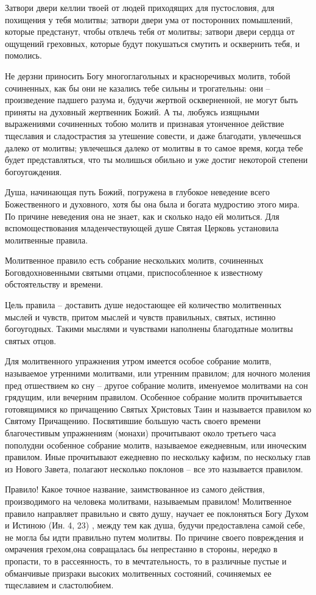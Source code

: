 Затвори двери келлии твоей от людей приходящих для пустословия, для похищения у тебя молитвы; затвори двери ума от посторонних помышлений, которые предстанут, чтобы отвлечь тебя от молитвы; затвори двери сердца от ощущений греховных, которые будут покушаться смутить и осквернить тебя, и помолись.

Не дерзни приносить Богу многоглагольных и красноречивых молитв, тобой сочиненных, как бы они не казались тебе сильны и трогательны: они – произведение падшего разума и, будучи жертвой оскверненной, не могут быть приняты на духовный жертвенник Божий. А ты, любуясь изящными выражениями сочиненных тобою молитв и признавая утонченное действие тщеславия и сладострастия за утешение совести, и даже благодати, увлечешься далеко от молитвы; увлечешься далеко от молитвы в то самое время, когда тебе будет представляться, что ты молишься обильно и уже достиг некоторой степени богоугождения.

Душа, начинающая путь Божий, погружена в глубокое неведение всего Божественного и духовного, хотя бы она была и богата мудростию этого мира. По причине неведения она не знает, как и сколько надо ей молиться. Для вспомоществования младенчествующей душе Святая Церковь установила молитвенные правила.

Молитвенное правило есть собрание нескольких молитв, сочиненных Боговдохновенными святыми отцами, приспособленное к известному обстоятельству и времени.

Цель правила – доставить душе недостающее ей количество молитвенных мыслей и чувств, притом мыслей и чувств правильных, святых, истинно богоугодных. Такими мыслями и чувствами наполнены благодатные молитвы святых отцов.

Для молитвенного упражнения утром имеется особое собрание молитв, называемое утренними молитвами, или утренним правилом; для ночного моления пред отшествием ко сну – другое собрание молитв, именуемое молитвами на сон грядущим, или вечерним правилом. Особенное собрание молитв прочитывается готовящимися ко причащению Святых Христовых Таин и называется правилом ко Святому Причащению. Посвятившие большую часть своего времени благочестивым упражнениям (монахи) прочитывают около третьего часа пополудни особенное собрание молитв, называемое ежедневным, или иноческим правилом. Иные прочитывают ежедневно по нескольку кафизм, по нескольку глав из Нового Завета, полагают несколько поклонов – все это называется правилом.

Правило! Какое точное название, заимствованное из самого действия, производимого на человека молитвами, называемым правилом! Молитвенное правило направляет правильно и свято душу, научает ее поклоняться Богу Духом и Истиною (Ин. 4, 23) , между тем как душа, будучи предоставлена самой себе, не могла бы идти правильно путем молитвы. По причине своего повреждения и омрачения грехом,она совращалась бы непрестанно в стороны, нередко в пропасти, то в рассеянность, то в мечтательность, то в различные пустые и обманчивые призраки высоких молитвенных состояний, сочиняемых ее тщеславием и сластолюбием.

